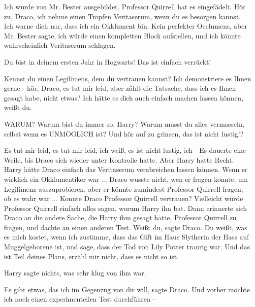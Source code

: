 \glqq{}Ich wurde von Mr. Bester ausgebildet. Professor Quirrell hat es
eingefädelt. Hör zu, Draco, ich nehme einen Tropfen Veritaserum, wenn du es
besorgen kannst. Ich warne dich nur, dass ich ein Okklument bin. Kein perfekter
Occlumens, aber Mr. Bester sagte, ich würde einen kompletten Block aufstellen,
und ich könnte wahrscheinlich Veritaserum schlagen.\grqq{}

\glqq{}Du bist in deinem ersten Jahr in Hogwarts! Das ist einfach
verrückt!\grqq{}

\glqq{}Kennst du einen Legilimens, dem du vertrauen kannst? Ich demonstriere es
Ihnen gerne - hör, Draco, es tut mir leid, aber zählt die Tatsache, dass ich es
Ihnen gesagt habe, nicht etwas? Ich hätte es dich auch einfach machen lassen
können, weißt du.\grqq{}

\glqq{}WARUM? Warum bist du immer so, Harry? Warum musst du alles vermasseln,
selbst wenn es UNMÖGLICH ist? Und hör auf zu grinsen, das ist nicht
lustig!?\grqq{}

\glqq{}Es tut mir leid, es tut mir leid, ich weiß, es ist nicht lustig, ich
-\grqq{} Es dauerte eine Weile, bis Draco sich wieder unter Kontrolle hatte.
Aber Harry hatte Recht. Harry hätte Draco einfach das Veritaserum verabreichen
lassen können. Wenn er wirklich ein Okklumentiker war ... Draco wusste nicht, wen
er fragen konnte, um Legilimenz auszuprobieren, aber er könnte zumindest
Professor Quirrell fragen, ob es wahr war ... Konnte Draco Professor Quirrell
vertrauen? Vielleicht würde Professor Quirrell einfach alles sagen, worum Harry
ihn bat. Dann erinnerte sich Draco an die andere Sache, die Harry ihm gesagt
hatte, Professor Quirrell zu fragen, und dachte an einen anderen Test. \glqq{}
Weißt du\grqq{}, sagte Draco. \glqq{}Du weißt, was es mich kostet, wenn ich
zustimme, dass das Gift im Haus Slytherin der Hass auf Muggelgeborene ist, und
sage, dass der Tod von Lily Potter traurig war. Und das ist Teil deines Plans,
erzähl mir nicht, dass es nicht so ist.\grqq{}

Harry sagte nichts, was sehr klug von ihm war.

\glqq{}Es gibt etwas, das ich im Gegenzug von dir will\grqq{}, sagte Draco. \glqq{}
Und vorher möchte ich noch einen experimentellen Test durchführen -\grqq{}

